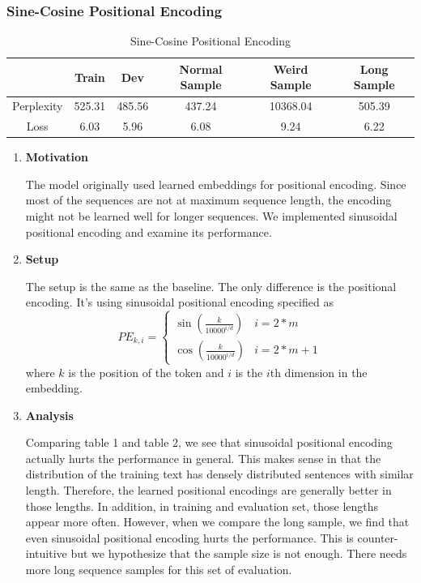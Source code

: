 \documentclass{article}
\newenvironment{solution}{\color{blue}}{}
\begin{document}
\subsubsection{Sine-Cosine Positional Encoding}

\begin{solution}
  \begin{table}[!htbp]
    \caption{Sine-Cosine Positional Encoding}
    \label{sinusoidal}
    \begin{center}
      \begin{tabular}{| c | c | c | c | c | c |}
        \hline
        & Train & Dev & Normal Sample & Weird Sample & Long Sample \\ \hline
        Perplexity & 525.31 & 485.56 & 437.24 & 10368.04 & 505.39 \\ \hline
        Loss & 6.03 & 5.96 & 6.08 & 9.24 & 6.22 \\ \hline
      \end{tabular}
    \end{center}
  \end{table}

  \begin{enumerate}
    \item \textbf{Motivation}
    
    The model originally used learned embeddings for positional encoding. Since most of the sequences are not at maximum sequence length, the encoding might not be learned well for longer sequences. We implemented sinusoidal positional encoding and examine its performance.
    \item \textbf{Setup}
    
    The setup is the same as the baseline. The only difference is the positional encoding. It's using sinusoidal positional encoding specified as 
    $$PE_{k, i} = \begin{cases}
       \sin (\frac{k}{10000^{i / d}}) &i = 2 * m
      \\ \cos (\frac{k}{10000^{i / d}}) &i = 2 * m + 1
    \end{cases}$$
    where $k$ is the position of the token and $i$ is the $i$th dimension in the embedding.

    \item \textbf{Analysis}
    
    Comparing table 1 and table 2, we see that sinusoidal positional encoding actually hurts the performance in general. This makes sense in that the distribution of the training text has densely distributed sentences with similar length. Therefore, the learned positional encodings are generally better in those lengths. In addition, in training and evaluation set, those lengths appear more often. However, when we compare the long sample, we find that even sinusoidal positional encoding hurts the performance. This is counter-intuitive but we hypothesize that the sample size is not enough. There needs more long sequence samples for this set of evaluation.
  \end{enumerate}
\end{solution}
\end{document}
